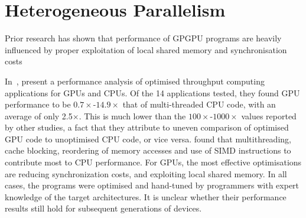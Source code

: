 %


\section{Heterogeneous Parallelism}


Prior research has shown that performance of GPGPU programs are
heavily influenced by proper exploitation of local shared memory and
synchronisation costs~\cite{Ryoo2008a, Lee2010}


In~\cite{Lee2010}, \citeauthor{Lee2010} present a performance analysis
of optimised throughput computing applications for GPUs and CPUs. Of
the 14 applications tested, they found GPU performance to be
$0.7\times$-$14.9\times$ that of multi-threaded CPU code, with an
average of only 2.5$\times$. This is much lower than the
$100\times$-$1000\times$ values reported by other studies,
a fact that they attribute to uneven comparison of optimised GPU code
to unoptimised CPU code, or vice versa. \citeauthor{Lee2010} found
that multithreading, cache blocking, reordering of memory accesses and
use of SIMD instructions to contribute most to CPU performance. For
GPUs, the most effective optimisations are reducing synchronization
costs, and exploiting local shared memory. In all cases, the programs
were optimised and hand-tuned by programmers with expert knowledge of
the target architectures. It is unclear whether their performance
results still hold for subsequent generations of devices.

